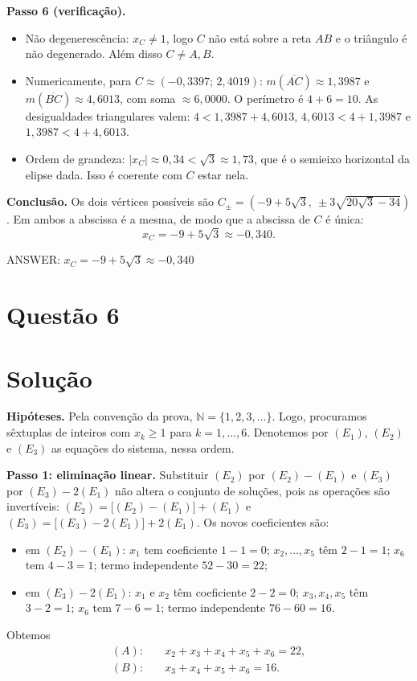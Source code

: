 \documentclass{article}%
\begin{document}
\textbf{Passo 6 (verificação).}
\begin{itemize}
\item Não degenerescência: $x_C\neq 1$, logo $C$ não está sobre a reta $AB$ e o triângulo é não degenerado. Além disso $C\neq A,B$.
\item Numericamente, para $C\approx(-0{,}3397;\,2{,}4019)$: $m(\overline{AC})\approx 1{,}3987$ e $m(\overline{BC})\approx 4{,}6013$, com soma $\approx 6{,}0000$. O perímetro é $4+6=10$. As desigualdades triangulares valem: $4<1{,}3987+4{,}6013$, $4{,}6013<4+1{,}3987$ e $1{,}3987<4+4{,}6013$.
\item Ordem de grandeza: $|x_C|\approx 0{,}34<\sqrt{3}\approx 1{,}73$, que é o semieixo horizontal da elipse dada. Isso é coerente com $C$ estar nela.
\end{itemize}

\textbf{Conclusão.} Os dois vértices possíveis são $C_{\pm}=\left(-9+5\sqrt{3},\ \pm 3\sqrt{20\sqrt{3}-34}\right)$. Em ambos a abscissa é a mesma, de modo que a abscissa de $C$ é única:
\[ x_C=-9+5\sqrt{3}\approx -0{,}340. \]

ANSWER: $x_C=-9+5\sqrt{3}\approx -0{,}340$%
\newpage%
\section*{Questão 6}

\section*{Solução}

\textbf{Hipóteses.} Pela convenção da prova, $\mathbb{N}=\{1,2,3,\ldots\}$. Logo, procuramos sêxtuplas de inteiros com $x_k\geq 1$ para $k=1,\ldots,6$. Denotemos por $(E_1)$, $(E_2)$ e $(E_3)$ as equações do sistema, nessa ordem.

\textbf{Passo 1: eliminação linear.} Substituir $(E_2)$ por $(E_2)-(E_1)$ e $(E_3)$ por $(E_3)-2(E_1)$ não altera o conjunto de soluções, pois as operações são invertíveis: $(E_2)=\big[(E_2)-(E_1)\big]+(E_1)$ e $(E_3)=\big[(E_3)-2(E_1)\big]+2(E_1)$. Os novos coeficientes são:
\begin{itemize}
\item em $(E_2)-(E_1)$: $x_1$ tem coeficiente $1-1=0$; $x_2,\ldots,x_5$ têm $2-1=1$; $x_6$ tem $4-3=1$; termo independente $52-30=22$;
\item em $(E_3)-2(E_1)$: $x_1$ e $x_2$ têm coeficiente $2-2=0$; $x_3,x_4,x_5$ têm $3-2=1$; $x_6$ tem $7-6=1$; termo independente $76-60=16$.
\end{itemize}
Obtemos
\begin{align*}
(A):&\quad x_2+x_3+x_4+x_5+x_6=22,\\
(B):&\quad x_3+x_4+x_5+x_6=16.
\end{align*}
\end{document}
